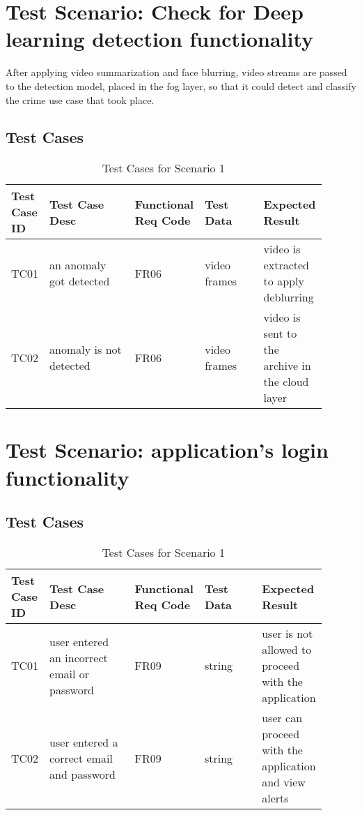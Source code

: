 \documentclass[12pt]{article}
\begin{document}
\section{Test Scenario: Check for Deep learning detection functionality}\label{sec:TSy}
After applying video summarization and face blurring, video streams are passed to the detection model, placed in the fog layer, so that it could detect and classify the crime use case that took place. 
\subsection{Test Cases}
\begin{table}[h]
\caption{Test Cases for Scenario 1}
\label{tab:TC1}
\begin{tabular}{|p{0.1\linewidth}|p{0.3\linewidth}|p{0.1\linewidth}|p{0.2\linewidth}|p{0.2\linewidth}|}
\hline
Test Case ID & Test Case Desc & Functional Req Code & Test Data & Expected Result \\ \hline
TC01  & an anomaly got detected & FR06 &  video frames   & video is extracted to apply deblurring                \\ \hline
TC02 & anomaly is not detected   & FR06    &  video frames      &  video is sent to the archive in the cloud layer         \\ \hline

\end{tabular}
\end{table}


\newpage
\section{Test Scenario: application's login functionality}\label{sec:TSy}
\subsection{Test Cases}
\begin{table}[h]
\caption{Test Cases for Scenario 1}
\label{tab:TC1}
\begin{tabular}{|p{0.1\linewidth}|p{0.3\linewidth}|p{0.1\linewidth}|p{0.2\linewidth}|p{0.2\linewidth}|}
\hline
Test Case ID & Test Case Desc & Functional Req Code & Test Data & Expected Result \\ \hline
TC01  & user entered an incorrect email or password & FR09 & string   & user is not allowed to proceed with the application               \\ \hline
TC02 & user entered a correct email and password   & FR09    &  string      &  user can proceed with the application and view alerts          \\ \hline

\end{tabular}
\end{table}
\end{document}
